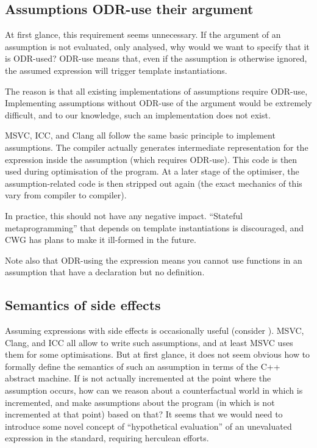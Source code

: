 \subsection{Assumptions ODR-use their argument}

At first glance, this requirement seems unnecessary. If the argument of an assumption is not evaluated, only analysed, why would we want to specify that it is ODR-used? ODR-use means that, even if the assumption is otherwise ignored, the assumed expression will trigger template instantiations.

The reason is that all existing implementations of assumptions require ODR-use, Implementing assumptions without ODR-use of the argument would be extremely difficult, and to our knowledge, such an implementation does not exist.

MSVC, ICC, and Clang all follow the same basic principle to implement assumptions. The compiler actually generates intermediate representation for the expression inside the assumption (which requires ODR-use). This code is then used during optimisation of the program. At a later stage of the optimiser, the assumption-related code is then stripped out again (the exact mechanics of this vary from compiler to compiler).

In practice, this should not have any negative impact. ``Stateful metaprogramming'' that depends on template instantiations is discouraged, and CWG has plans to make it ill-formed in the future.

Note also that ODR-using the expression means you cannot use functions in an assumption that have a declaration but no definition.

\subsection{Semantics of side effects}
\label{subsec:side_effects}

Assuming expressions with side effects is occasionally useful (consider \tcode{[[assume(++ptr != end)]]}). MSVC, Clang, and ICC all allow to write such assumptions, and at least MSVC uses them for some optimisations. But at first glance, it does not seem obvious how to formally define the semantics of such an assumption in terms of the C++ abstract machine. If  is not actually incremented at the point where the assumption occurs, how can we reason about a counterfactual world in which  is incremented, and make assumptions about the program (in which  is not incremented at that point) based on that? It seems that we would need to introduce some novel concept of ``hypothetical evaluation'' of an unevaluated expression in the standard, requiring herculean efforts.

